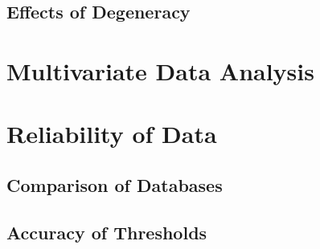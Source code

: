 \subsection{Effects of Degeneracy}\label{subsec:Effects_of_Degeneracy}

\section{Multivariate Data Analysis}\label{sec:MV_Data_Analysis}

\section{Reliability of Data}\label{sec:Reliability_of_Data}

\subsection{Comparison of Databases}\label{subsec:Comparison_of_Databases}

\subsection{Accuracy of Thresholds}\label{subsec:Accuracy_of_Thresholds}